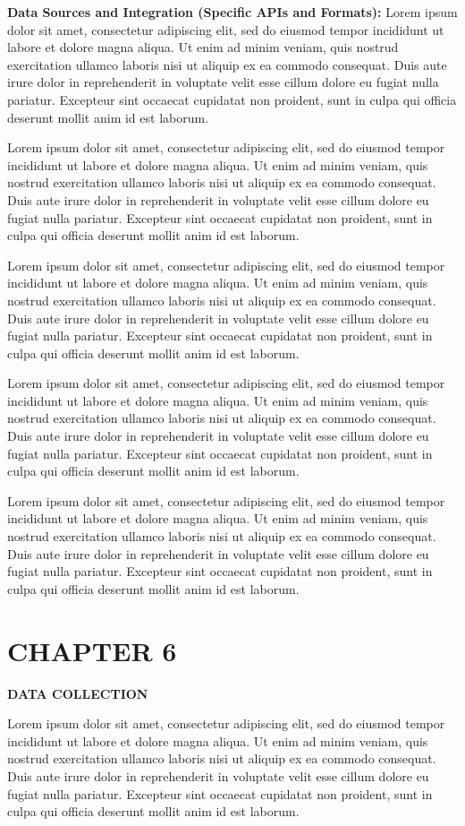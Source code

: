 \documentclass[12pt]{article}
\newcommand{\centersection}[1]{%
  \begin{center}
    \fontfamily{ptm}\fontsize{14}{16}\selectfont\bfseries\uppercase{#1}
  \end{center}
}
\begin{document}
\textbf{Data Sources and Integration (Specific APIs and Formats):} Lorem ipsum dolor sit amet, consectetur adipiscing elit, sed do eiusmod tempor incididunt ut labore et dolore magna aliqua. Ut enim ad minim veniam, quis nostrud exercitation ullamco laboris nisi ut aliquip ex ea commodo consequat. Duis aute irure dolor in reprehenderit in voluptate velit esse cillum dolore eu fugiat nulla pariatur. Excepteur sint occaecat cupidatat non proident, sunt in culpa qui officia deserunt mollit anim id est laborum.

Lorem ipsum dolor sit amet, consectetur adipiscing elit, sed do eiusmod tempor incididunt ut labore et dolore magna aliqua. Ut enim ad minim veniam, quis nostrud exercitation ullamco laboris nisi ut aliquip ex ea commodo consequat. Duis aute irure dolor in reprehenderit in voluptate velit esse cillum dolore eu fugiat nulla pariatur. Excepteur sint occaecat cupidatat non proident, sunt in culpa qui officia deserunt mollit anim id est laborum.

Lorem ipsum dolor sit amet, consectetur adipiscing elit, sed do eiusmod tempor incididunt ut labore et dolore magna aliqua. Ut enim ad minim veniam, quis nostrud exercitation ullamco laboris nisi ut aliquip ex ea commodo consequat. Duis aute irure dolor in reprehenderit in voluptate velit esse cillum dolore eu fugiat nulla pariatur. Excepteur sint occaecat cupidatat non proident, sunt in culpa qui officia deserunt mollit anim id est laborum.

Lorem ipsum dolor sit amet, consectetur adipiscing elit, sed do eiusmod tempor incididunt ut labore et dolore magna aliqua. Ut enim ad minim veniam, quis nostrud exercitation ullamco laboris nisi ut aliquip ex ea commodo consequat. Duis aute irure dolor in reprehenderit in voluptate velit esse cillum dolore eu fugiat nulla pariatur. Excepteur sint occaecat cupidatat non proident, sunt in culpa qui officia deserunt mollit anim id est laborum.

Lorem ipsum dolor sit amet, consectetur adipiscing elit, sed do eiusmod tempor incididunt ut labore et dolore magna aliqua. Ut enim ad minim veniam, quis nostrud exercitation ullamco laboris nisi ut aliquip ex ea commodo consequat. Duis aute irure dolor in reprehenderit in voluptate velit esse cillum dolore eu fugiat nulla pariatur. Excepteur sint occaecat cupidatat non proident, sunt in culpa qui officia deserunt mollit anim id est laborum.

\newpage %
\section*{CHAPTER 6}
\centersection{Data Collection }
Lorem ipsum dolor sit amet, consectetur adipiscing elit, sed do eiusmod tempor incididunt ut labore et dolore magna aliqua. Ut enim ad minim veniam, quis nostrud exercitation ullamco laboris nisi ut aliquip ex ea commodo consequat. Duis aute irure dolor in reprehenderit in voluptate velit esse cillum dolore eu fugiat nulla pariatur. Excepteur sint occaecat cupidatat non proident, sunt in culpa qui officia deserunt mollit anim id est laborum.
\end{document}
